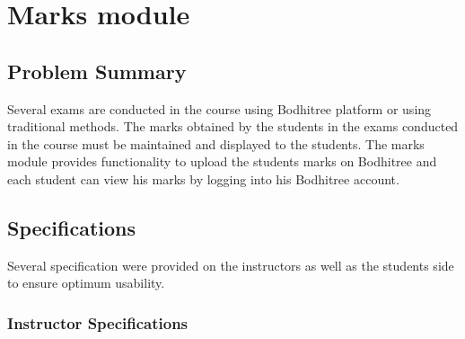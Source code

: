 \section{Marks module}

\subsection{Problem Summary}

\hspace{0.35cm} Several exams are conducted in the course using Bodhitree platform or using traditional methods. The marks obtained by the students in the exams conducted in the course must be maintained and displayed to the students. The marks module provides functionality to upload the students marks on Bodhitree and each student can view his marks by logging into his Bodhitree account.

\subsection{Specifications}

\hspace{0.35cm} Several specification were provided on the instructors as well as the students side to ensure optimum usability.

\subsubsection{Instructor Specifications}

